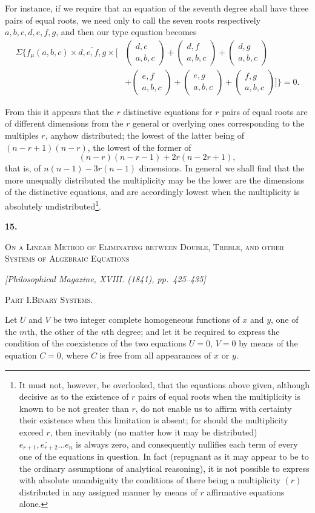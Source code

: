 \documentclass[11pt]{article}
\newcommand{\paperhead}[3]{%
  \clearpage
  \begin{center}
  {\Large\bfseries #1.}\par\vspace{0.85em}
  {\large\scshape #2}\par\vspace{0.6em}
  {\itshape [#3]}\par
  \end{center}\vspace{0.4em}}
\newcommand{\sourcepage}[1]{\marginpar{\scriptsize p.~#1}}
\newcommand{\rowparen}[2]{\left(\begin{matrix}#1\\#2\end{matrix}\right)}
\newcommand{\pgram}[1]{\overline{#1}}
\begin{document}
For instance, if we require that an equation of the seventh degree shall have three pairs of equal roots, we need only to call the seven roots respectively $a,b,c,d,e,f,g$, and then our type equation becomes
\[
\begin{aligned}
\Sigma\biggl\{ f_\mu(a,b,c)\times \pgram{d,e,f,g}\times
\biggl[&\rowparen{d,e}{a,b,c}+\rowparen{d,f}{a,b,c}+\rowparen{d,g}{a,b,c}\\
&+\rowparen{e,f}{a,b,c}+\rowparen{e,g}{a,b,c}+\rowparen{f,g}{a,b,c}\biggr]\biggr\}=0.
\end{aligned}
\]

From this it appears that the $r$ distinctive equations for $r$ pairs of equal roots are of different dimensions from the $r$ general or overlying ones corresponding to the multiples $r$, anyhow distributed; the lowest of the latter being of $(n-r+1)(n-r)$, the lowest of the former of
\[
 (n-r)(n-r-1)+2r(n-2r+1),
\]
that is, of $n(n-1)-3r(n-1)$ dimensions. In general we shall find that the more unequally distributed the multiplicity may be the lower are the dimensions of the distinctive equations, and are accordingly lowest when the multiplicity is absolutely undistributed\footnote{It must not, however, be overlooked, that the equations above given, although decisive as to the existence of $r$ pairs of equal roots when the multiplicity is known to be not greater than $r$, do not enable us to affirm with certainty their existence when this limitation is absent; for should the multiplicity exceed $r$, then inevitably (no matter how it may be distributed) $\pgram{e_{r+1},e_{r+2}\ldots e_n}$ is always zero, and consequently nullifies each term of every one of the equations in question. In fact (repugnant as it may appear to be to the ordinary assumptions of analytical reasoning), it is not possible to express with absolute unambiguity the conditions of there being a multiplicity $(r)$ distributed in any assigned manner by means of $r$ affirmative equations alone.}.

\paperhead{15}{On a Linear Method of Eliminating between Double, Treble, and other Systems of Algebraic Equations}{Philosophical Magazine, XVIII. (1841), pp.~425--435}

\sourcepage{75}
\begin{center}\scshape Part I.\quad Binary Systems.\end{center}

Let $U$ and $V$ be two integer complete homogeneous functions of $x$ and $y$, one of the $m$th, the other of the $n$th degree; and let it be required to express the condition of the coexistence of the two equations $U=0$, $V=0$ by means of the equation $C=0$, where $C$ is free from all appearances of $x$ or $y$.
\end{document}

